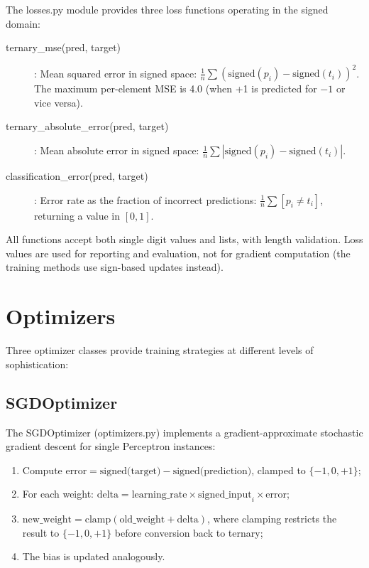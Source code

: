 \documentclass[12pt,a4paper,twoside]{book}
\theoremstyle{trinarytheorem}
\theoremstyle{trinarydefinition}
\newcommand{\code}[1]{\textsf{#1}}
\begin{document}
The \code{losses.py} module provides three loss functions operating in
the signed domain:

\begin{description}
    \item[\code{ternary\_mse(pred, target)}]: Mean squared error in
          signed space:
          $\frac{1}{n}\sum (\text{signed}(p_i) - \text{signed}(t_i))^2$.
          The maximum per-element MSE is 4.0 (when +1 is predicted for
          $-1$ or vice versa).
    \item[\code{ternary\_absolute\_error(pred, target)}]: Mean absolute
          error in signed space:
          $\frac{1}{n}\sum |\text{signed}(p_i) - \text{signed}(t_i)|$.
    \item[\code{classification\_error(pred, target)}]: Error rate as
          the fraction of incorrect predictions:
          $\frac{1}{n}\sum [p_i \neq t_i]$, returning a value in $[0,1]$.
\end{description}

All functions accept both single digit values and lists, with length
validation. Loss values are used for reporting and evaluation, not for
gradient computation (the training methods use sign-based updates
instead).

\section{Optimizers}

Three optimizer classes provide training strategies at different levels
of sophistication:

\subsection{SGDOptimizer}

The \code{SGDOptimizer} (\code{optimizers.py}) implements a
gradient-approximate stochastic gradient descent for single
\code{Perceptron} instances:

\begin{enumerate}
    \item Compute $\text{error} = \text{signed(target)} -
          \text{signed(prediction)}$, clamped to $\{-1,0,+1\}$;
    \item For each weight:
          $\text{delta} = \text{learning\_rate} \times
          \text{signed\_input}_i \times \text{error}$;
    \item $\text{new\_weight} = \text{clamp}(\text{old\_weight} +
          \text{delta})$, where clamping restricts the result to
          $\{-1,0,+1\}$ before conversion back to ternary;
    \item The bias is updated analogously.
\end{enumerate}
\end{document}
